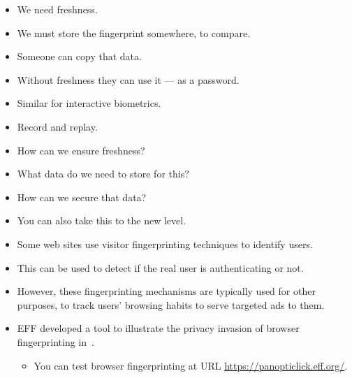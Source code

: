 \begin{frame}
  \begin{remark}
    \begin{itemize}
      \item We need freshness.
      \item We must store the fingerprint somewhere, to compare.
      \item Someone can copy that data.
      \item Without freshness they can use it --- as a password.
    \end{itemize}
  \end{remark}

  \pause{}

  \begin{remark}
    \begin{itemize}
      \item Similar for interactive biometrics.
      \item Record and replay.
    \end{itemize}
  \end{remark}
\end{frame}

\begin{frame}
  \begin{exercise}
    \begin{itemize}
      \item How can we ensure freshness?
      \item What data do we need to store for this?
      \item How can we secure that data?
    \end{itemize}
  \end{exercise}
\end{frame}

\begin{frame}
  \begin{itemize}
    \item You can also take this to the new level.

    \item Some web sites use visitor fingerprinting techniques to identify 
      users.

    \item This can be used to detect if the real user is authenticating or not.

    \item However, these fingerprinting mechanisms are typically used for other 
      purposes, to track users' browsing habits to serve targeted ads to them.

    \item EFF developed a tool to illustrate the privacy invasion of browser 
      fingerprinting in~\cite{Eckersley2010hui}.
      \begin{itemize}
        \item You can test browser fingerprinting at URL 
          \url{https://panopticlick.eff.org/}.
      \end{itemize}

  \end{itemize}
\end{frame}


